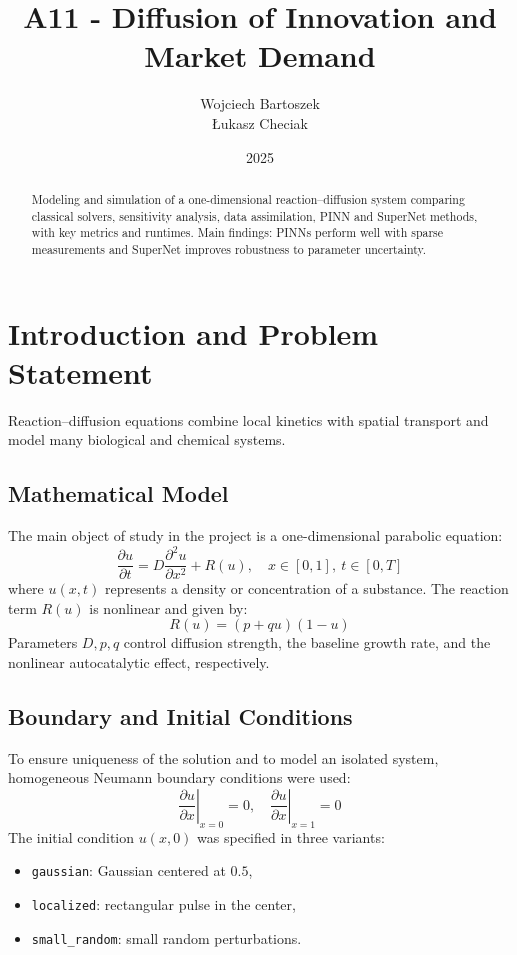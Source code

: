 \documentclass[a4paper,11pt]{article}
\title{A11 - Diffusion of Innovation and Market Demand}
\author{Wojciech Bartoszek \\ \L{}ukasz Checiak}
\date{2025}
\begin{document}
\maketitle
\begin{abstract}
Modeling and simulation of a one-dimensional reaction--diffusion system comparing classical solvers, sensitivity analysis, data assimilation, PINN and SuperNet methods, with key metrics and runtimes. Main findings: PINNs perform well with sparse measurements and SuperNet improves robustness to parameter uncertainty.
\end{abstract}

\section{Introduction and Problem Statement}
Reaction--diffusion equations combine local kinetics with spatial transport and model many biological and chemical systems.

\subsection{Mathematical Model}
The main object of study in the project is a one-dimensional parabolic equation:
\begin{equation}
    \frac{\partial u}{\partial t} = D \frac{\partial^2 u}{\partial x^2} + R(u), \quad x \in [0, 1], \ t \in [0, T]
\end{equation}
where $u(x,t)$ represents a density or concentration of a substance. The reaction term $R(u)$ is nonlinear and given by:
\begin{equation}
    R(u) = (p + q u)(1 - u)
\end{equation}
Parameters $D, p, q$ control diffusion strength, the baseline growth rate, and the nonlinear autocatalytic effect, respectively.

\subsection{Boundary and Initial Conditions}
To ensure uniqueness of the solution and to model an isolated system, homogeneous Neumann boundary conditions were used:
\begin{equation}
    \left. \frac{\partial u}{\partial x} \right|_{x=0} = 0, \quad \left. \frac{\partial u}{\partial x} \right|_{x=1} = 0
\end{equation}
The initial condition $u(x,0)$ was specified in three variants:
\begin{itemize}
    \item \texttt{gaussian}: Gaussian centered at $0.5$,
    \item \texttt{localized}: rectangular pulse in the center,
    \item \texttt{small\_random}: small random perturbations.
\end{itemize}
\end{document}
